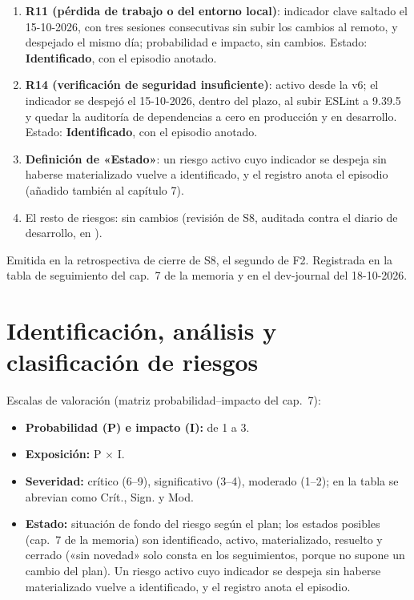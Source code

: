 \documentclass[11pt,a4paper]{article}
\begin{document}
\begin{enumerate}
  El indicador se mantiene por decisión del autor: el riesgo es precisamente la demora de las respuestas.
  \item \textbf{R11 (pérdida de trabajo o del entorno local)}: indicador clave saltado el 15-10-2026, con tres sesiones consecutivas sin subir los cambios al remoto, y despejado el mismo día; probabilidad e impacto, sin cambios.
  Estado: \textbf{Identificado}, con el episodio anotado.
  \item \textbf{R14 (verificación de seguridad insuficiente)}: activo desde la v6; el indicador se despejó el 15-10-2026, dentro del plazo, al subir ESLint a 9.39.5 y quedar la auditoría de dependencias a cero en producción y en desarrollo.
  Estado: \textbf{Identificado}, con el episodio anotado.
  \item \textbf{Definición de «Estado»}: un riesgo activo cuyo indicador se despeja sin haberse materializado vuelve a identificado, y el registro anota el episodio (añadido también al capítulo 7).
  \item El resto de riesgos: sin cambios (revisión de S8, auditada contra el diario de desarrollo, en ).
\end{enumerate}

Emitida en la retrospectiva de cierre de S8, el segundo  de F2.
Registrada en la tabla de seguimiento del cap.~7 de la memoria y en el dev-journal del 18-10-2026.

\section{Identificación, análisis y clasificación de riesgos}

Escalas de valoración (matriz probabilidad--impacto del cap.~7):
\begin{itemize}
  \item \textbf{Probabilidad (P) e impacto (I):} de 1 a 3.
  \item \textbf{Exposición:} P \(\times\) I.
  \item \textbf{Severidad:} crítico (6–9), significativo (3–4), moderado (1–2); en la tabla se abrevian como Crít., Sign. y Mod.
  \item \textbf{Estado:} situación de fondo del riesgo según el plan; los estados posibles (cap.~7 de la memoria) son identificado, activo, materializado, resuelto y cerrado («sin novedad» solo consta en los seguimientos, porque no supone un cambio del plan).
  Un riesgo activo cuyo indicador se despeja sin haberse materializado vuelve a identificado, y el registro anota el episodio.
\end{itemize}
\end{document}
